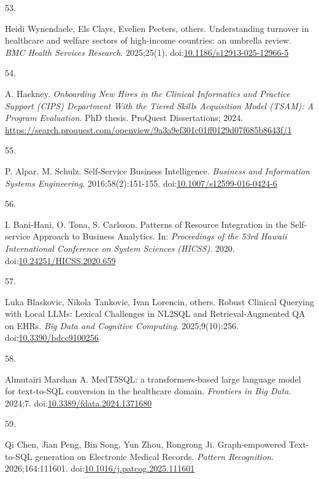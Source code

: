 \documentclass[
  american,
  11pt,
  letterpaper,
  oneside  ,captions=tableheading
]{scrartcl}
\newlength{\cslhangindent}
\newlength{\csllabelwidth}
\newenvironment{CSLReferences}[2] %
 {\begin{list}{}{%
  \setlength{\itemindent}{0pt}
  \setlength{\leftmargin}{0pt}
  \setlength{\parsep}{0pt}
  \ifodd #1
   \setlength{\leftmargin}{\cslhangindent}
   \setlength{\itemindent}{-1\cslhangindent}
  \fi
  \setlength{\itemsep}{#2\baselineskip}}}
 {\end{list}}
\newcommand{\CSLLeftMargin}[1]{\parbox[t]{\csllabelwidth}{\strut#1\strut}}
\newcommand{\CSLRightInline}[1]{\parbox[t]{\linewidth - \csllabelwidth}{\strut#1\strut}}
\begin{document}
\begin{CSLReferences}{0}{1}
\CSLLeftMargin{53. }%
\CSLRightInline{Heidi Wynendaele, Els Clays, Evelien Peeters, others.
{Understanding turnover in healthcare and welfare sectors of high-income
countries: an umbrella review}. \emph{BMC Health Services Research}.
2025;25(1).
doi:\href{https://doi.org/10.1186/s12913-025-12966-5}{10.1186/s12913-025-12966-5}}

\CSLLeftMargin{54. }%
\CSLRightInline{A. Hackney. \emph{{Onboarding New Hires in the Clinical
Informatics and Practice Support (CIPS) Department With the Tiered
Skills Acquisition Model (TSAM): A Program Evaluation}}. PhD thesis.
ProQuest Dissertations; 2024.
\url{https://search.proquest.com/openview/9a3a9ef301c01ff0129d07f685b8643f/1}}

\CSLLeftMargin{55. }%
\CSLRightInline{P. Alpar, M. Schulz. {Self-Service Business
Intelligence}. \emph{Business and Information Systems Engineering}.
2016;58(2):151-155.
doi:\href{https://doi.org/10.1007/s12599-016-0424-6}{10.1007/s12599-016-0424-6}}

\CSLLeftMargin{56. }%
\CSLRightInline{I. Bani-Hani, O. Tona, S. Carlsson. {Patterns of
Resource Integration in the Self-service Approach to Business
Analytics}. In: \emph{Proceedings of the 53rd Hawaii International
Conference on System Sciences (HICSS)}. 2020.
doi:\href{https://doi.org/10.24251/HICSS.2020.659}{10.24251/HICSS.2020.659}}

\CSLLeftMargin{57. }%
\CSLRightInline{Luka Blaskovic, Nikola Tankovic, Ivan Lorencin, others.
{Robust Clinical Querying with Local LLMs: Lexical Challenges in NL2SQL
and Retrieval-Augmented QA on EHRs}. \emph{Big Data and Cognitive
Computing}. 2025;9(10):256.
doi:\href{https://doi.org/10.3390/bdcc9100256}{10.3390/bdcc9100256}}

\CSLLeftMargin{58. }%
\CSLRightInline{Almutairi Marshan A. {MedT5SQL: a transformers-based
large language model for text-to-SQL conversion in the healthcare
domain}. \emph{Frontiers in Big Data}. 2024;7.
doi:\href{https://doi.org/10.3389/fdata.2024.1371680}{10.3389/fdata.2024.1371680}}

\CSLLeftMargin{59. }%
\CSLRightInline{Qi Chen, Jian Peng, Bin Song, Yun Zhou, Rongrong Ji.
{Graph-empowered Text-to-SQL generation on Electronic Medical Records}.
\emph{Pattern Recognition}. 2026;164:111601.
doi:\href{https://doi.org/10.1016/j.patcog.2025.111601}{10.1016/j.patcog.2025.111601}}


\end{CSLReferences}
\end{document}
